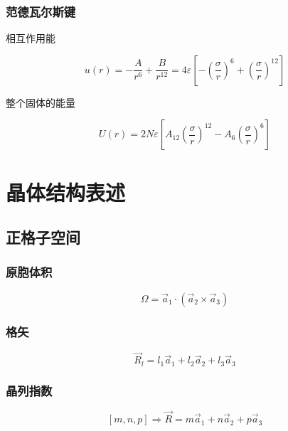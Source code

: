 \documentclass{article}
\begin{document}
\begin{multicols}{2}
\subsubsection{范德瓦尔斯键}

相互作用能

\begin{equation*}
  u \left( r \right) = - \dfrac{A}{r^{6}} + \dfrac{B}{r^{12}} = 4\varepsilon \left[ - \left( \dfrac{\sigma}{r} \right)^{6} + \left( \dfrac{\sigma}{r} \right)^{12} \right] 
\end{equation*}

整个固体的能量

\begin{equation*}
  U \left( r \right) = 2 N \varepsilon \left[ A_{12} \left( \dfrac{\sigma}{r} \right)^{12} - A_6 \left( \dfrac{\sigma}{r} \right)^{6} \right] 
\end{equation*}

\section{晶体结构表述}

\subsection{正格子空间}

\subsubsection{原胞体积}

\begin{equation*}
  \Omega = \vec{a}_1 \cdot \left( \vec{a}_2 \times \vec{a}_3 \right)
\end{equation*}

\subsubsection{格矢}

\begin{equation*}
  \vec{R}_l = l_1 \vec{a}_1 + l_2 \vec{a}_2 + l_3 \vec{a}_3
\end{equation*}

\subsubsection{晶列指数}

\begin{equation*}
  \left[ m,n,p \right] \Rightarrow \vec{R} = m \vec{a}_1 + n \vec{a}_2 + p \vec{a}_3 
\end{equation*}


\end{multicols}
\end{document}
